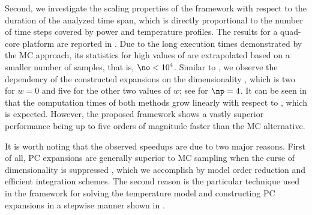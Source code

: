 Second, we investigate the scaling properties of the framework with respect to
the duration of the analyzed time span, which is directly proportional to the
number of time steps \ns covered by power and temperature profiles. The results
for a quad-core platform are reported in . Due to the
long execution times demonstrated by the \ac{MC} approach, its statistics for
high values of \ns are extrapolated based on a smaller number of samples, that
is, $\no < 10^4$. Similar to , we observe the
dependency of the constructed expansions on the dimensionality \nz, which is two
for $w = 0$ and five for the other two values of $w$; see
 for $\np = 4$. It can be seen in
 that the computation times of both methods grow
linearly with respect to \ns, which is expected. However, the proposed framework
shows a vastly superior performance being up to five orders of magnitude faster
than the \ac{MC} alternative.

It is worth noting that the observed speedups are due to two major reasons.
First of all, \ac{PC} expansions are generally superior to \ac{MC} sampling when
the curse of dimensionality is suppressed \cite{eldred2008, xiu2010}, which we
accomplish by model order reduction and efficient integration schemes. The
second reason is the particular technique used in the framework for solving the
temperature model and constructing \ac{PC} expansions in a stepwise manner shown
in .
